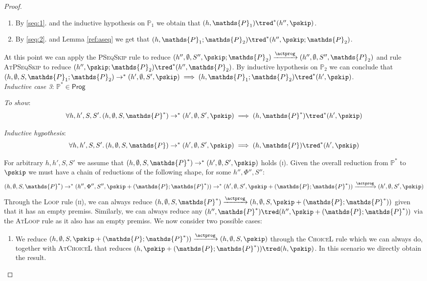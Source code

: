 \begin{thm}
{\begin{proof}
\begin{enumerate}
	\item \label{seq:2} By \ref{seq:1}. and the inductive hypothesis on $\mathds{P}_1$ we obtain that $(h, \mathds{P}_1) \tred^* (h'', \pskip)$.
	
	\item By \ref{seq:2}. and Lemma \ref{ref:aseq} we get that $(h, \mathds{P}_1 ; \mathds{P}_2) \tred^* (h'', \pskip ; \mathds{P}_2)$.
\end{enumerate}

At this point we can apply the \textsc{PSeqSkip} rule to reduce $(h'', \emptyset, S'', \pskip ; \mathds{P}_2) \xrightarrow{\actprog} (h'', \emptyset, S'', \mathds{P}_2)$ and rule \textsc{AtPSeqSkip} to reduce $(h'', \pskip ; \mathds{P}_2) \tred^* (h'', \mathds{P}_2)$. By inductive hypothesis on $\mathds{P}_2$ we can conclude that $(h, \emptyset, S, \mathds{P}_1 ; \mathds{P}_2) \rightarrow^* (h', \emptyset, S', \pskip) \implies (h, \mathds{P}_1 ; \mathds{P}_2) \tred^* (h', \pskip)$. \\

\textit{Inductive case 3}: $\mathds{P}^* \in \mathsf{Prog}$

\textit{To show}:
\[
	\forall h, h', S, S' \ldotp
	(h, \emptyset, S, \mathds{P}^*) \rightarrow^* (h', \emptyset, S', \pskip) \implies 
	(h, \mathds{P}^* ) \tred^* (h', \pskip)
\]

\textit{Inductive hypothesis}:
\[
	\forall h, h', S, S' \ldotp
	(h, \emptyset, S, \mathds{P}) \rightarrow^* (h', \emptyset, S', \pskip) \implies 
	(h, \mathds{P}) \tred^* (h', \pskip)
\]

For arbitrary $h, h', S, S'$ we assume that $(h, \emptyset, S, \mathds{P}^*) \rightarrow^* (h', \emptyset, S', \pskip)$ holds (\textsc{i}). Given the overall reduction from $\mathds{P}^*$ to $\pskip$ we must have a chain of reductions of the following shape, for some $h'', \Phi'', S''$:
\[
(h, \emptyset, S, \mathds{P}^*) \rightarrow^* (h'', \Phi'', S'', \pskip + (\mathds{P} ; \mathds{P}^*)) \rightarrow^*  (h', \emptyset, S', \pskip + (\mathds{P} ; \mathds{P}^*)) \xrightarrow{\actprog} (h', \emptyset, S', \pskip)
\]
Through the \textsc{Loop} rule (\textsc{ii}), we can always reduce $(h, \emptyset, S, \mathds{P}^*) \xrightarrow{\actprog} (h, \emptyset, S, \pskip + (\mathds{P} ; \mathds{P}^*))$ given that it has an empty premiss. Similarly, we can always reduce any $(h'', \mathds{P}^*) \tred (h'', \pskip + (\mathds{P} ; \mathds{P}^*))$ via the \textsc{AtLoop} rule as it also has an empty premiss. We now consider two possible cases:
\begin{enumerate}
	\item \label{loop:1} We reduce $(h, \emptyset, S, \pskip + (\mathds{P} ; \mathds{P}^*)) \xrightarrow{\actprog} (h, \emptyset, S, \pskip)$ through the \textsc{ChoiceL} rule which we can always do, together with \textsc{AtChoiceL} that reduces $(h, \pskip + (\mathds{P} ; \mathds{P}^*)) \tred (h, \pskip)$. In this scenario we directly obtain the result.
	

\end{enumerate}
\end{proof}}
\end{thm}
